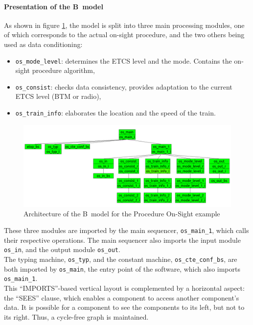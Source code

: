 \paragraph{Presentation of the B~model}
As shown in figure \ref{fig:procos}, the model is split into three main processing modules, one of which corresponds to the actual on-sight procedure,
and the two others being used as data conditioning:
\begin{itemize}
\item \verb+os_mode_level+: determines the ETCS level and the mode. Contains the on-sight procedure algorithm,
\item \verb+os_consist+: checks data consistency, provides adaptation to the current ETCS level (BTM or radio),
\item \verb+os_train_info+: elaborates the location and the speed of the train.
\end{itemize}

\begin{figure}[h!]
\centering
\includegraphics[width=1\textwidth]{figures/procedureos}
\caption{Architecture of the B~model for the Procedure On-Sight example}
\label{fig:procos}
\end{figure}

These three modules are imported by the main sequencer, \verb+os_main_1+, which calls their respective operations. The main sequencer also imports the input module \verb+os_in+, and the output module \verb+os_out+.\\
The typing machine, \verb+os_typ+, and the constant machine, \verb+os_cte_conf_bs+, are both imported by \verb+os_main+, the entry point of the software, which also imports \verb+os_main_1+.\\
 
This ``IMPORTS''-based vertical layout is complemented by a horizontal aspect: the ``SEES'' clause, which enables a component to access another component's data. It is possible for a component to see the components to its left, but not to its right. Thus, a cycle-free graph is maintained.
 
